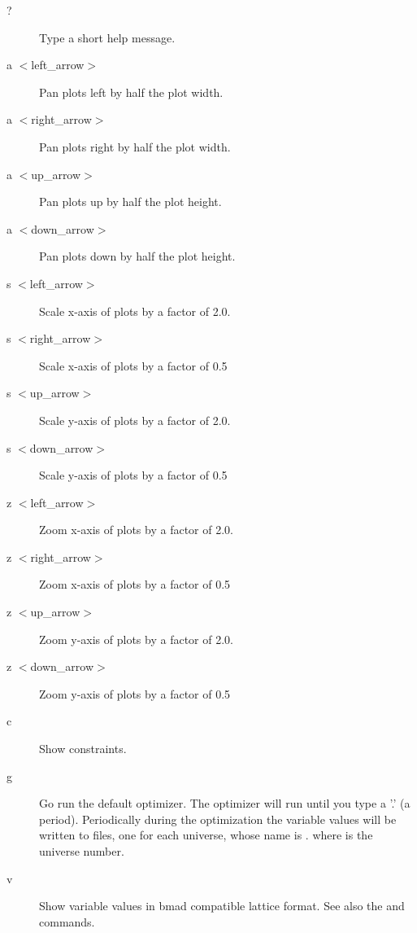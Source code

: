 {\begin{description}
\item[?]
Type a short help message.

\item[a $<$left\_arrow$>$]
Pan plots left by half the plot width.

\item[a $<$right\_arrow$>$]
Pan plots right by half the plot width.

\item[a $<$up\_arrow$>$]
Pan plots up by half the plot height.

\item[a $<$down\_arrow$>$]
Pan plots down by half the plot height.

\item[s $<$left\_arrow$>$]
Scale x-axis of plots by a factor of 2.0.

\item[s $<$right\_arrow$>$]
Scale x-axis of plots by a factor of 0.5

\item[s $<$up\_arrow$>$]
Scale y-axis of plots by a factor of 2.0.

\item[s $<$down\_arrow$>$]
Scale y-axis of plots by a factor of 0.5


\item[z $<$left\_arrow$>$]
Zoom x-axis of plots by a factor of 2.0.

\item[z $<$right\_arrow$>$]
Zoom x-axis of plots by a factor of 0.5

\item[z $<$up\_arrow$>$]
Zoom y-axis of plots by a factor of 2.0.

\item[z $<$down\_arrow$>$]
Zoom y-axis of plots by a factor of 0.5

\item[c]  
Show constraints.

\item[g]
Go run the default optimizer. The optimizer will run until you type a
'.' (a period).  Periodically during the optimization the variable
values will be written to files, one for each universe, whose name is
. where \vn{\#} is the universe number.

\item[v]
Show variable values in bmad compatible lattice format. See also the
 and  commands.


\end{description}}
